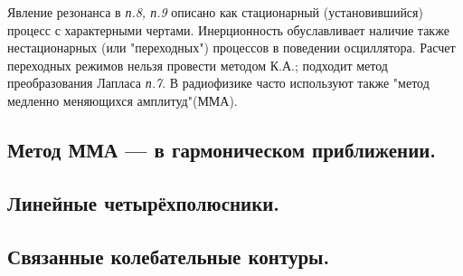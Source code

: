\documentclass[../main/main.tex]{subfiles}
\begin{document}
Явление резонанса в \textit{п.8, п.9} описано как стационарный (установившийся) процесс с характерными чертами. Инерционность обуславливает наличие также нестационарных (или "переходных") процессов в поведении осциллятора. Расчет переходных режимов нельзя провести методом К.А.; подходит метод преобразования Лапласа \textit{п.7}. В радиофизике часто используют также "метод медленно меняющихся амплитуд"(ММА).

\subsection{Метод ММА --- в гармоническом приближении.}

\subsection{Линейные четырёхполюсники.}

\subsection{Связанные колебательные контуры.}
\end{document}
